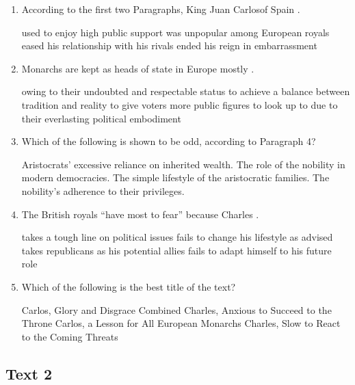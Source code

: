 \begin{enumerate}[resume]
	\item
 According to the first two Paragraphs, King Juan
	Carlosof Spain \lineread.


\fourchoices
{used to enjoy high public support}
{was unpopular among European royals}
{eased his relationship with his rivals}
{ended his reign in embarrassment}


\item
 Monarchs are kept as heads of state in Europe
mostly \lineread.


\fourchoices
{owing to their undoubted and respectable status}
{to achieve a balance between tradition and reality}
{to give voters more public figures to look up to}
{due to their everlasting political embodiment}



\item
Which of the following is shown to be odd, according to
Paragraph 4?


\fourchoices
{Aristocrats' excessive reliance on inherited wealth.}
{The role of the nobility in modern democracies.}
{The simple lifestyle of the aristocratic families.}
{The nobility's adherence to their privileges.}


\item
The British royals ``have most to fear'' because
Charles \lineread.


\fourchoices
{takes a tough line on political issues}
{fails to change his lifestyle as advised}
{takes republicans as his potential allies}
{fails to adapt himself to his future role}



\item
Which of the following is the best title of the text?


\fourchoices
{Carlos, Glory and Disgrace Combined}
{Charles, Anxious to Succeed to the Throne}
{Carlos, a Lesson for All European Monarchs}
{Charles, Slow to React to the Coming Threats}


\end{enumerate}


\newpage
\subsection{Text 2}


